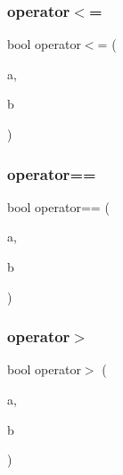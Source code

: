 \mbox{\label{class_c_fee_rate_af580c9e0a2509b79a497cee50116bfcc}} 
\subsubsection{\texorpdfstring{operator$<$=}{operator<=}}
{\footnotesize\ttfamily bool operator$<$= (\begin{DoxyParamCaption}\item[{const \mbox{\hyperlink{class_c_fee_rate}{C\+Fee\+Rate}} \&}]{a,  }\item[{const \mbox{\hyperlink{class_c_fee_rate}{C\+Fee\+Rate}} \&}]{b }\end{DoxyParamCaption})\hspace{0.3cm}{\ttfamily [friend]}}

\mbox{\label{class_c_fee_rate_a90b4daf7a7d840f47c453b9ba51744cf}} 
\subsubsection{\texorpdfstring{operator==}{operator==}}
{\footnotesize\ttfamily bool operator== (\begin{DoxyParamCaption}\item[{const \mbox{\hyperlink{class_c_fee_rate}{C\+Fee\+Rate}} \&}]{a,  }\item[{const \mbox{\hyperlink{class_c_fee_rate}{C\+Fee\+Rate}} \&}]{b }\end{DoxyParamCaption})\hspace{0.3cm}{\ttfamily [friend]}}

\mbox{\label{class_c_fee_rate_ab69eafe1cbb126cc0549bc5936422a2c}} 
\subsubsection{\texorpdfstring{operator$>$}{operator>}}
{\footnotesize\ttfamily bool operator$>$ (\begin{DoxyParamCaption}\item[{const \mbox{\hyperlink{class_c_fee_rate}{C\+Fee\+Rate}} \&}]{a,  }\item[{const \mbox{\hyperlink{class_c_fee_rate}{C\+Fee\+Rate}} \&}]{b }\end{DoxyParamCaption})\hspace{0.3cm}{\ttfamily [friend]}}

